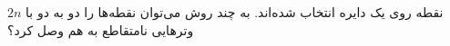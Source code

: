 \EXERCISE
$2n$
 نقطه روی يک دايره انتخاب شده‌اند. به چند روش می‌توان نقطه‌ها را دو به دو با وترهايی نامتقاطع به هم وصل كرد؟